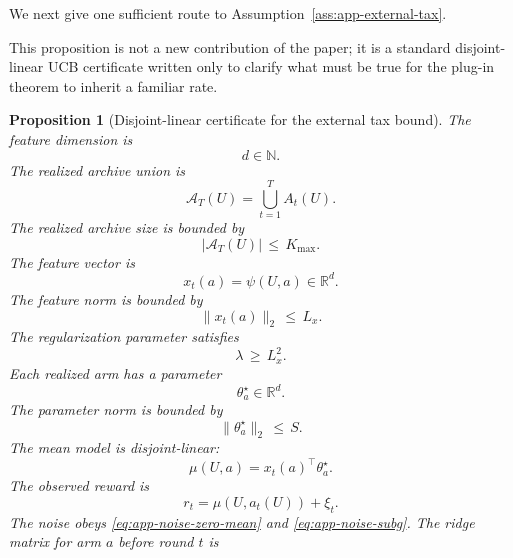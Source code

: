 \documentclass{article} %
\newtheorem{proposition}[theorem]{Proposition}
\begin{document}
We next give one sufficient route to Assumption~\ref{ass:app-external-tax}.

This proposition is not a new contribution of the paper; it is a standard disjoint-linear UCB certificate written only to clarify what must be true for the plug-in theorem to inherit a familiar rate.

\begin{proposition}[Disjoint-linear certificate for the external tax bound]
\label{prop:2}
The feature dimension is
\begin{equation}
\label{eq:app-lin-d}
d\in\mathbb{N}.
\end{equation}
The realized archive union is
\begin{equation}
\label{eq:app-realized-union}
\mathcal{A}_T(U)
=
\bigcup_{t=1}^{T}A_t(U).
\end{equation}
The realized archive size is bounded by
\begin{equation}
\label{eq:app-kmax}
|\mathcal{A}_T(U)|
\,\le\,
K_{\max}.
\end{equation}
The feature vector is
\begin{equation}
\label{eq:app-lin-feature}
x_t(a)
=
\psi(U,a)\in\mathbb{R}^{d}.
\end{equation}
The feature norm is bounded by
\begin{equation}
\label{eq:app-lin-feature-bound}
\|x_t(a)\|_2
\,\le\,
L_x.
\end{equation}
The regularization parameter satisfies
\begin{equation}
\label{eq:app-lin-lambda}
\lambda
\,\ge\,
L_x^2.
\end{equation}
Each realized arm has a parameter
\begin{equation}
\label{eq:app-lin-theta}
\theta_a^\star\in\mathbb{R}^{d}.
\end{equation}
The parameter norm is bounded by
\begin{equation}
\label{eq:app-lin-theta-bound}
\|\theta_a^\star\|_2
\,\le\,
S.
\end{equation}
The mean model is disjoint-linear:
\begin{equation}
\label{eq:app-lin-model}
\mu(U,a)
=
x_t(a)^\top\theta_a^\star.
\end{equation}
The observed reward is
\begin{equation}
\label{eq:app-lin-observed}
r_t
=
\mu(U,a_t(U))+\xi_t.
\end{equation}
The noise obeys \eqref{eq:app-noise-zero-mean} and \eqref{eq:app-noise-subg}.  The ridge matrix for arm \(a\) before round \(t\) is

\end{proposition}
\end{document}
